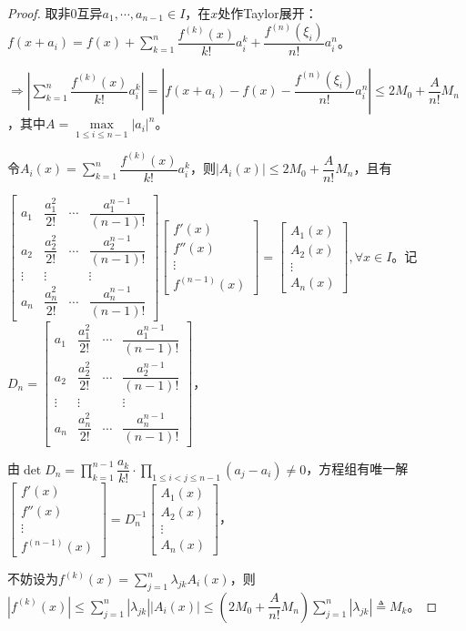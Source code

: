                 \begin{proof}
                    取非0互异$a_1,\cdots,a_{n-1}\in I$，在$x$处作Taylor展开：$f(x+a_i)=f(x)+\sum\limits_{k=1}^{n}\dfrac{f^{(k)}(x)}{k!}a_i^k+\dfrac{f^{(n)}(\xi_i)}{n!}a_i^n$。

                    $\Rightarrow |\sum\limits_{k=1}^{n}\dfrac{f^{(k)}(x)}{k!}a_i^k|=|f(x+a_i)-f(x)-\dfrac{f^{(n)}(\xi_i)}{n!}a_i^n|\leq 2M_0+\dfrac{A}{n!}M_n$，其中$A=\max\limits_{1\leq i\leq n-1}|a_i|^n$。

                    令$A_i(x)=\sum\limits_{k=1}^{n}\dfrac{f^{(k)}(x)}{k!}a_i^k$，则$|A_i(x)|\leq 2M_0+\dfrac{A}{n!}M_n$，且有

                    $\begin{bmatrix}a_1&\dfrac{a_1^2}{2!}&\cdots&\dfrac{a_1^{n-1}}{(n-1)!}\\a_2&\dfrac{a_2^2}{2!}&\cdots&\dfrac{a_2^{n-1}}{(n-1)!}\\\vdots&\vdots&&\vdots\\a_n&\dfrac{a_n^2}{2!}&\cdots&\dfrac{a_n^{n-1}}{(n-1)!}\end{bmatrix}\begin{bmatrix}f'(x)\\f''(x)\\\vdots\\f^{(n-1)}(x)\end{bmatrix}=\begin{bmatrix}A_1(x)\\A_2(x)\\\vdots\\A_n(x)\end{bmatrix},\forall x\in I$。记$D_n=\begin{bmatrix}a_1&\dfrac{a_1^2}{2!}&\cdots&\dfrac{a_1^{n-1}}{(n-1)!}\\a_2&\dfrac{a_2^2}{2!}&\cdots&\dfrac{a_2^{n-1}}{(n-1)!}\\\vdots&\vdots&&\vdots\\a_n&\dfrac{a_n^2}{2!}&\cdots&\dfrac{a_n^{n-1}}{(n-1)!}\end{bmatrix}$，

                    由$\det D_n=\prod\limits_{k=1}^{n-1}\dfrac{a_k}{k!}\cdot\prod\limits_{1\leq i<j \leq n-1}(a_j-a_i)\neq 0$，方程组有唯一解$\begin{bmatrix}f'(x)\\f''(x)\\\vdots\\f^{(n-1)}(x)\end{bmatrix}=D_n^{-1}\begin{bmatrix}A_1(x)\\A_2(x)\\\vdots\\A_n(x)\end{bmatrix}$，

                    不妨设为$f^{(k)}(x)=\sum\limits_{j=1}^n \lambda_{jk}A_i(x)$，则$|f^{(k)}(x)|\leq \sum\limits_{j=1}^{n}|\lambda_{jk}||A_i(x)|\leq \left(2M_0+\dfrac{A}{n!}M_n\right)\sum\limits_{j=1}^{n}|\lambda_{jk}|\triangleq M_k$。
                \end{proof}

